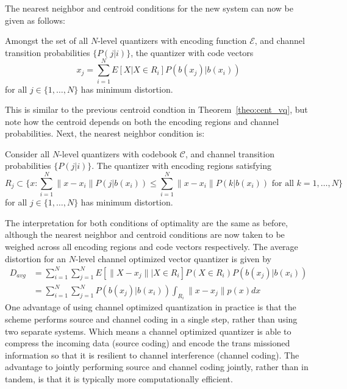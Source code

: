 The nearest neighbor and centroid conditions for the new system can now be given as follows:
\begin{theorem}
\label{theo:cent_covq}
Amongst the set of all $N$-level quantizers with encoding function $\mathcal{E}$, and channel transition probabilities $\{P(j|i)\}$, the quantizer with code vectors
\begin{equation}
  \label{eq:cent_covq}
  x_j = \sum_{i=1}^N E[X | X \in R_i]P(b(x_j)|b(x_i))
\end{equation}
for all $j \in \{1,\ldots,N\}$ has minimum distortion.
\end{theorem}
This is similar to the previous centroid condtion in Theorem~\ref{theo:cent_vq}, but note how the centroid depends on both the encoding regions and channel probabilities. Next, the nearest neighbor condition is:
\begin{theorem}
Consider all $N$-level quantizers with codebook $\mathcal{C}$, and channel transition probabilities $\{P(j|i)\}$. The quantizer with encoding regions satisfying
\begin{equation}
R_j \subset \{x : \sum_{i=1}^N \| x - x_i \|P(j|b(x_i)) \le \sum_{i=1}^N \| x - x_i \|P(k|b(x_i)) \text{ for all } k = 1,\ldots,N \}
\end{equation}
for all $j \in \{1,\ldots,N\}$ has minimum distortion.
\end{theorem}
The interpretation for both conditions of optimality are the same as before, although the nearest neighbor and centroid conditions are now taken to be weighed across all encoding regions and code vectors respectively. The average distortion for an $N$-level channel optimized vector quantizer is given by
\begin{align}
D_{avg} &= \sum_{i=1}^{N} \sum_{j=1}^{N} E[ \|X - x_j\| | X \in R_i] P(X \in R_i) P(b(x_j)|b(x_i))\\
&= \sum_{i=1}^{N} \sum_{j=1}^{N} P(b(x_j)|b(x_i)) \int_{R_i} \|x - x_j\| p(x) dx
\end{align}
One advantage of using channel optimized quantization in practice is that the scheme performs source and channel coding in a single step, rather than using two separate systems. Which means a channel optimized quantizer is able to compress the incoming data (source coding) and encode the trans missioned information so that it is resilient to channel interference (channel coding). The advantage to jointly performing source and channel coding jointly, rather than in tandem, is that it is typically more computationally efficient.

